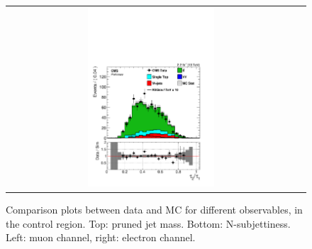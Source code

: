 \begin{figure}[htbp]
\begin{tabular}{cc}
 \includegraphics[width=0.45\textwidth]{chapters/Chapter8-EventSelection/Figures/WVanalysis/ControlPlots_TTbar/el/jet_tau2tau1_0}\\
 \end{tabular}
 \caption{Comparison plots between data and MC for different observables, in the \ttbar control region.
 Top: pruned jet mass. Bottom: N-subjettiness. 
 Left: muon channel, right: electron channel. }
 \label{fig:TTbar_controlPlots_4}
 \end{figure}

